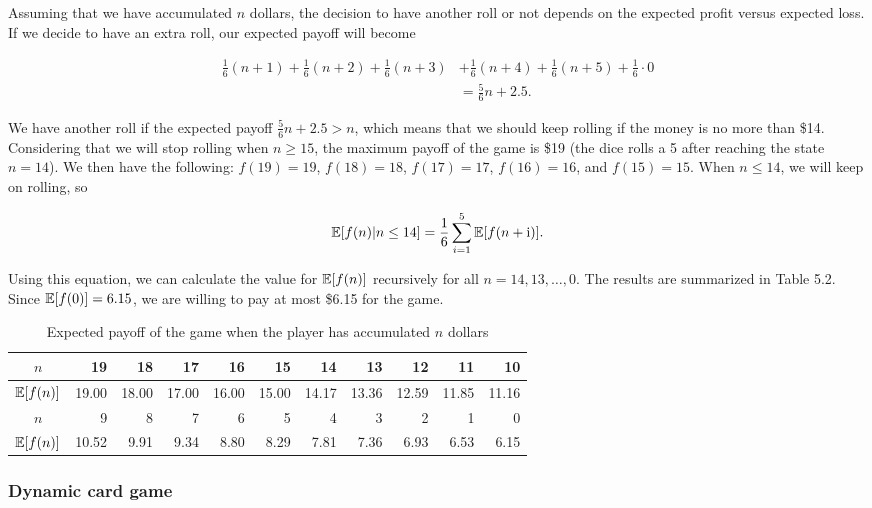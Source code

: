 \begin{solution}
Assuming that we have accumulated $n$ dollars, the decision to have another roll or not
depends on the expected profit versus expected loss. If we decide to have an extra roll,
our expected payoff will become

\[
\begin{aligned}
\frac{1}{6}(n+1)+\frac{1}{6}(n+2)+\frac{1}{6}(n+3)
&+\frac{1}{6}(n+4)+\frac{1}{6}(n+5)+\frac{1}{6}\cdot0\\
&=\frac{5}{6}n+2.5.
\end{aligned}
\]

We have another roll if the expected payoff $\frac{5}{6}n+2.5>n$, which means that we
should keep rolling if the money is no more than \$14. Considering that we will stop rolling
when $n\geq15$, the maximum payoff of the game is \$19 (the dice rolls a 5 after reaching
the state $n=14$). We then have the following: $f(19)=19$, $f(18)=18$, $f(17)=17$,
$f(16)=16$, and $f(15)=15$. When $n\leq14$, we will keep on rolling, so

\[
\mathbb{E}[f(n)\vert n\leq14]=\frac{1}{6}\sum_{i=1}^{5}\mathbb{E}[f(n+\mathrm{i})].
\]

Using this equation, we can calculate the value for $\mathbb{E}[f(n)]$ recursively for all
$n=14,13,\ldots,0$. The results are summarized in Table 5.2. Since $\mathbb{E}[f(0)]=6.15$,
we are willing to pay at most \$6.15 for the game.

\begin{table}[ht]
\centering
\small
\setlength{\tabcolsep}{6pt}
\begin{tabular}{|c|rrrrrrrrrr|}
\hline
$n$ & 19 & 18 & 17 & 16 & 15 & 14 & 13 & 12 & 11 & 10\\
\hline
$\mathbb{E}[f(n)]$ & 19.00 & 18.00 & 17.00 & 16.00 & 15.00 & 14.17 & 13.36 & 12.59 & 11.85 & 11.16\\
\hline
$n$ & 9 & 8 & 7 & 6 & 5 & 4 & 3 & 2 & 1 & 0\\
\hline
$\mathbb{E}[f(n)]$ & 10.52 & 9.91 & 9.34 & 8.80 & 8.29 & 7.81 & 7.36 & 6.93 & 6.53 & 6.15\\
\hline
\end{tabular}
\caption{Expected payoff of the game when the player has accumulated $n$ dollars}
\label{tab:zhou-table-5-2}
\end{table}
\end{solution}


\subsubsection{Dynamic card game}

